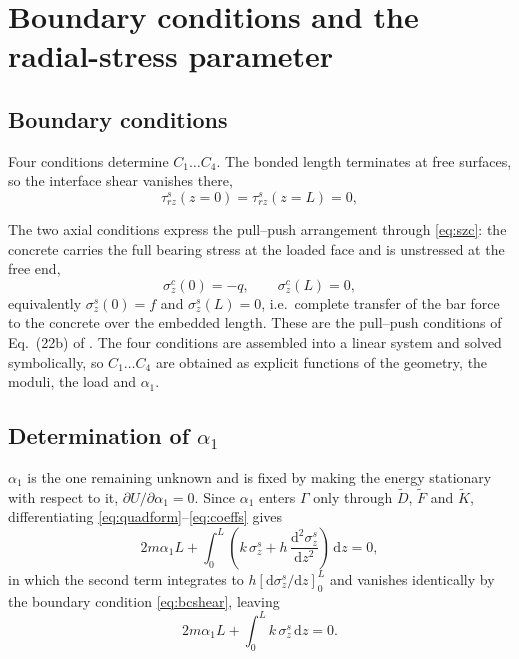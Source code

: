 \section{Boundary conditions and the radial-stress parameter}
\label{sec:closure}

\subsection{Boundary conditions}
\label{sec:bc}

Four conditions determine $C_1 \dots C_4$. The bonded length terminates at
free surfaces, so the interface shear vanishes there,
\begin{equation}
\label{eq:bcshear}
\tau_{rz}^{s}(z = 0) = \tau_{rz}^{s}(z = L) = 0 ,
\end{equation}

The two axial conditions express the pull--push arrangement through
\eqref{eq:szc}: the concrete carries the full bearing stress at the loaded
face and is unstressed at the free end,
\begin{equation}
\label{eq:bcaxial}
\sigma_z^{c}(0) = -q, \qquad \sigma_z^{c}(L) = 0,
\end{equation}
equivalently $\sigma_z^{s}(0) = f$ and $\sigma_z^{s}(L) = 0$, i.e.\ complete transfer of
the bar force to the concrete over the embedded length. These are the
pull--push conditions of Eq.~(22b) of
\textcite{alaviAnalyticalProcedureFailure2025}. The four conditions are
assembled into a linear system and solved symbolically, so $C_1 \dots C_4$ are
obtained as explicit functions of the geometry, the moduli, the load and
$\alpha_1$.

\subsection{Determination of \texorpdfstring{$\alpha_1$}{alpha 1}}
\label{sec:alpha}
 
\begingroup
\setlength{\abovedisplayskip}{13pt plus 3pt minus 1pt}
\setlength{\belowdisplayskip}{13pt plus 3pt minus 1pt}
\setlength{\abovedisplayshortskip}{8pt plus 2pt minus 1pt}
\setlength{\belowdisplayshortskip}{8pt plus 2pt minus 1pt}
 
$\alpha_1$ is the one remaining unknown and is fixed by making the energy
stationary with respect to it, $\partial U/\partial\alpha_1 = 0$. Since
$\alpha_1$ enters $\Gamma$ only through $\tilde{D}$, $\tilde{F}$ and
$\tilde{K}$, differentiating \eqref{eq:quadform}--\eqref{eq:coeffs} gives
\begin{equation}
\label{eq:alphastat}
2m\alpha_1 L + \int_0^L \left( k\,\sigma_z^{s}
  + h\,\frac{\mathrm{d}^2\sigma_z^{s}}{\mathrm{d}z^2} \right)\,\mathrm{d}z = 0 ,
\end{equation}
in which the second term integrates to
$h\left[\mathrm{d}\sigma_z^{s}/\mathrm{d}z\right]_0^L$ and vanishes
identically by the boundary condition \eqref{eq:bcshear}, leaving
\begin{equation}
\label{eq:alphared}
2m\alpha_1 L + \int_0^L k\,\sigma_z^{s}\,\mathrm{d}z = 0 .
\end{equation}
 
